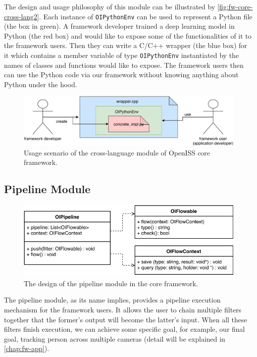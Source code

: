 The design and usage philosophy of this module can be illustrated by
\autoref{fig:fw-core-cross-lang2}. Each instance of \texttt{OIPythonEnv}
can be used to represent a Python file (the box in green). A framework
developer trained a deep learning model in Python (the red box)
and would like to expose some of the functionalities of it to the framework
users. Then they can write a C/C++ wrapper (the blue box) for it which
contains a member variable of type \texttt{OIPythonEnv} instantiated by the
names of classes and functions would like to expose. The framework users then
can use the Python code via our framework without knowing anything about Python
under the hood.

\begin{figure}
    \centering
    \includegraphics[scale=0.8]{figures/framework_core_cross_lang2.pdf}
    \caption
    {Usage scenario of the cross-language module of OpenISS core framework.}
    \label{fig:fw-core-cross-lang2}
\end{figure}

\subsection{Pipeline Module}
\label{sec:fw-design-core-pipeline}

\begin{figure}
    \includegraphics[width=\linewidth]{figures/framework_core_pipeline.pdf}
    \caption{The design of the pipeline module in the core framework.}
    \label{fig:fw-core-pipeline-uml}
\end{figure}

The pipeline module, as its name implies, provides a pipeline execution
mechanism for the framework users. It allows the user to chain multiple
filters together that the former's output will become the 
latter's input.
When all these filters finish execution, we can achieve some specific goal, for
example, our final goal, tracking person across multiple cameras (detail will
be explained in \autoref{chap:fw-app}).

